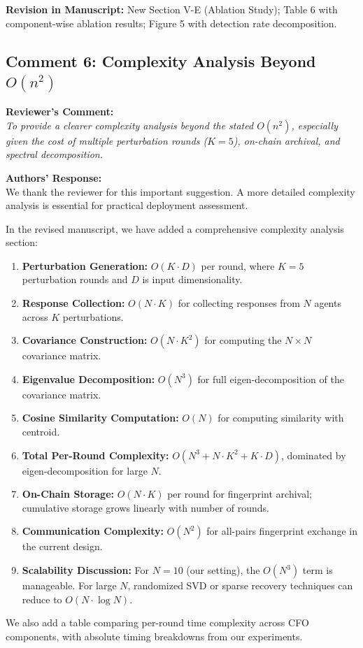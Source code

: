 \documentclass[11pt,a4paper]{article}
\newcommand{\reviewercomment}[1]{%
  \vspace{6pt}\noindent\textbf{\textcolor{reviewercolor}{Reviewer's Comment:}}\\
  \textcolor{reviewercolor}{\itshape #1}\vspace{4pt}}
\newcommand{\response}[1]{%
  \noindent\textbf{\textcolor{responsecolor}{Authors' Response:}}\\
  #1\vspace{8pt}}
\newcommand{\revision}[1]{%
  \noindent\textbf{Revision in Manuscript:} #1\vspace{4pt}}
\begin{document}
\revision{New Section V-E (Ablation Study); Table 6 with component-wise ablation results; Figure 5 with detection rate decomposition.}

\subsection*{Comment 6: Complexity Analysis Beyond $O(n^2)$}

\reviewercomment{To provide a clearer complexity analysis beyond the stated $O(n^2)$, especially given the cost of multiple perturbation rounds ($K=5$), on-chain archival, and spectral decomposition.}

\response{We thank the reviewer for this important suggestion. A more detailed complexity analysis is essential for practical deployment assessment.

In the revised manuscript, we have added a comprehensive complexity analysis section:

\begin{enumerate}[nosep]
\item \textbf{Perturbation Generation:} $O(K \cdot D)$ per round, where $K=5$ perturbation rounds and $D$ is input dimensionality.

\item \textbf{Response Collection:} $O(N \cdot K)$ for collecting responses from $N$ agents across $K$ perturbations.

\item \textbf{Covariance Construction:} $O(N \cdot K^2)$ for computing the $N \times N$ covariance matrix.

\item \textbf{Eigenvalue Decomposition:} $O(N^3)$ for full eigen-decomposition of the covariance matrix.

\item \textbf{Cosine Similarity Computation:} $O(N)$ for computing similarity with centroid.

\item \textbf{Total Per-Round Complexity:} $O(N^3 + N \cdot K^2 + K \cdot D)$, dominated by eigen-decomposition for large $N$.

\item \textbf{On-Chain Storage:} $O(N \cdot K)$ per round for fingerprint archival; cumulative storage grows linearly with number of rounds.

\item \textbf{Communication Complexity:} $O(N^2)$ for all-pairs fingerprint exchange in the current design.

\item \textbf{Scalability Discussion:} For $N=10$ (our setting), the $O(N^3)$ term is manageable. For large $N$, randomized SVD or sparse recovery techniques can reduce to $O(N \cdot \log N)$.
\end{enumerate}

We also add a table comparing per-round time complexity across CFO components, with absolute timing breakdowns from our experiments.}
\end{document}
